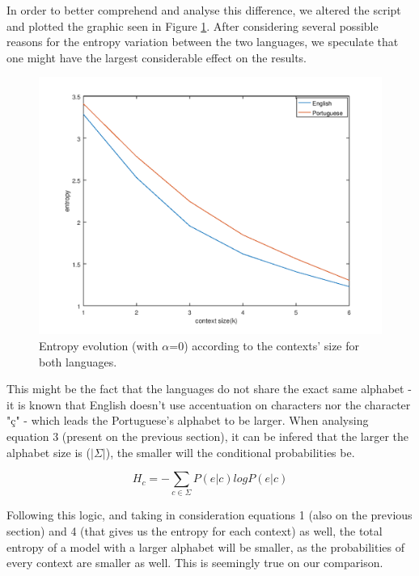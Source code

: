 \documentclass[12pt]{article}
\begin{document}
In order to better comprehend and analyse this difference, we altered the script
and plotted the graphic seen in Figure \ref{graph2}.
After considering several possible reasons for the entropy variation between
the two languages, we speculate that one might have the largest considerable 
effect on the results.

\begin{figure}[H]
  \includegraphics[width=6.3in]{ENvsPT.png}
  \caption{Entropy evolution (with $\alpha$=0) according to the contexts' size for both languages.}
  \label{graph2}
\end{figure}

This might be the fact that the languages do not share the exact same alphabet 
- it is known that English doesn't use accentuation on characters nor the 
character "ç" - which leads the Portuguese's alphabet to be larger.
When analysing equation 3 (present on the previous section), it can be infered 
that the larger the alphabet size is ($|\Sigma|$), the smaller will the 
conditional probabilities be.

\begin{equation}
  H_{c} = -\sum\limits_{c\in\Sigma} P(e|c) log P(e|c)
\end{equation}

Following this logic, and taking in consideration equations 1 (also on the 
previous section) and 4 (that gives us the entropy for each context) as well, 
the total entropy of a model with a larger alphabet will be smaller, as the 
probabilities of every context are smaller as well.
This is seemingly true on our comparison. 
\end{document}
